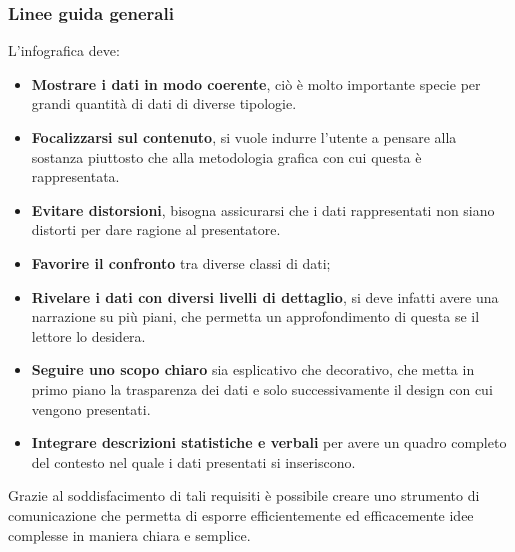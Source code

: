 \subsubsection{Linee guida generali}
L'infografica deve:
\begin{itemize}
    \item \textbf{Mostrare i dati in modo coerente}, ciò è molto importante specie per grandi quantità di dati di diverse tipologie.
    \item \textbf{Focalizzarsi sul contenuto}, si vuole indurre l'utente a pensare alla sostanza piuttosto che alla metodologia grafica con cui questa è rappresentata.
    \item \textbf{Evitare distorsioni}, bisogna assicurarsi che i dati rappresentati non siano distorti per dare ragione al presentatore.
    \item \textbf{Favorire il confronto} tra diverse classi di dati;
    \item \textbf{Rivelare i dati con diversi livelli di dettaglio}, si deve infatti avere una narrazione su più piani, che permetta un approfondimento di questa se il lettore lo desidera.
    \item \textbf{Seguire uno scopo chiaro} sia esplicativo che decorativo, che metta in primo piano la trasparenza dei dati e solo successivamente il design con cui vengono presentati.
    \item \textbf{Integrare descrizioni statistiche e verbali} per avere un quadro completo del contesto nel quale i dati presentati si inseriscono.
\end{itemize}
Grazie al soddisfacimento di tali requisiti è possibile creare uno strumento di comunicazione che permetta di esporre efficientemente ed efficacemente idee complesse in maniera chiara e semplice.

